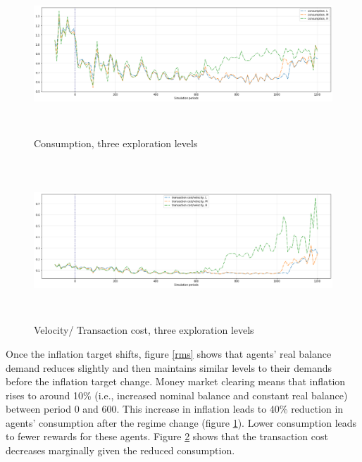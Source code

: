 \documentclass[hidelinks]{article}
\begin{document}
\begin{figure}[H]
	\caption{Consumption, three exploration levels}
	\centerline{\includegraphics[width=19cm,height=6cm]{consumption.png}}
	\label{cons}
\end{figure}


\begin{figure}[H]
	\caption{Velocity/ Transaction cost, three exploration levels}
	\centerline{\includegraphics[width=19cm,height=6cm]{velocity.png}}
	\label{velo}
\end{figure}


Once the inflation target shifts, figure \ref{rms} shows that agents' real balance demand reduces slightly and then maintains similar levels to their demands before the inflation target change. Money market clearing means that inflation rises to around 10\% (i.e., increased nominal balance and constant real balance) between period 0 and 600. This increase in inflation leads to 40\% reduction in agents' consumption after the regime change (figure \ref{cons}). Lower consumption leads to fewer rewards for these agents. Figure \ref{velo} shows that the transaction cost decreases marginally given the reduced consumption. 
\end{document}

